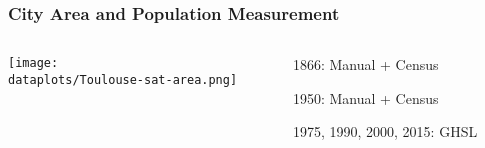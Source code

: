 \documentclass[aspectratio=169]{beamer}
\begin{document}
\begin{frame}
\frametitle{City Area and Population Measurement}
\begin{columns}

\begin{column}{0.7\textwidth}
	\begin{adjustbox}{center}
	\texttt{[image: \\dataplots/Toulouse-sat-area.png]}\end{adjustbox}
	\end{column}
\begin{column}{0.3\textwidth}
\begin{midi}
\item 1866: Manual + Census
\item 1950: Manual + Census
\item 1975, 1990, 2000, 2015: GHSL
\end{midi}
	
\end{column}
\end{columns}
\end{frame}
\end{document}
